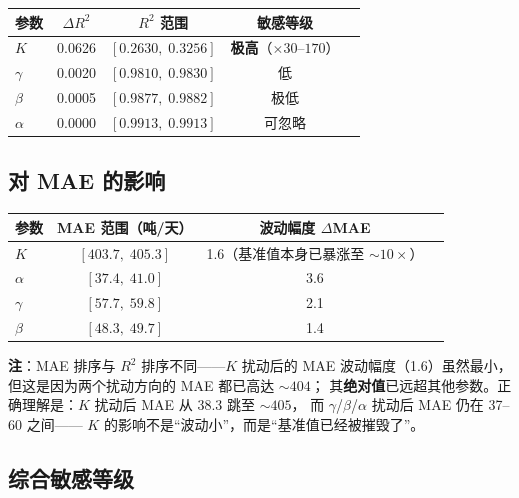 \documentclass[12pt,a4paper]{article}
\begin{document}
\begin{center}
\begin{tabular}{lcccc}
\toprule
参数 & $\Delta R^2$ & $R^2$ 范围 & 敏感等级 \\
\midrule
$K$      & 0.0626 & $[0.2630,\; 0.3256]$ & \textbf{极高}（$\times 30$--$170$）\\
$\gamma$ & 0.0020 & $[0.9810,\; 0.9830]$ & 低 \\
$\beta$  & 0.0005 & $[0.9877,\; 0.9882]$ & 极低 \\
$\alpha$ & 0.0000 & $[0.9913,\; 0.9913]$ & 可忽略 \\
\bottomrule
\end{tabular}
\end{center}

\subsection{对 MAE 的影响}

\begin{center}
\begin{tabular}{lccc}
\toprule
参数 & MAE 范围（吨/天） & 波动幅度 $\Delta$MAE \\
\midrule
$K$      & $[403.7,\; 405.3]$ & 1.6（基准值本身已暴涨至 $\sim 10\times$）\\
$\alpha$ & $[37.4,\; 41.0]$   & 3.6 \\
$\gamma$ & $[57.7,\; 59.8]$   & 2.1 \\
$\beta$  & $[48.3,\; 49.7]$   & 1.4 \\
\bottomrule
\end{tabular}
\end{center}

\textbf{注}：MAE 排序与 $R^2$ 排序不同——$K$ 扰动后的 MAE 波动幅度（1.6）虽然最小，
但这是因为两个扰动方向的 MAE 都已高达 $\sim 404$；
其\textbf{绝对值}已远超其他参数。正确理解是：$K$ 扰动后 MAE 从 38.3 跳至 $\sim 405$，
而 $\gamma$/$\beta$/$\alpha$ 扰动后 MAE 仍在 37--60 之间——
$K$ 的影响不是``波动小''，而是``基准值已经被摧毁了''。

\subsection{综合敏感等级}
\end{document}
